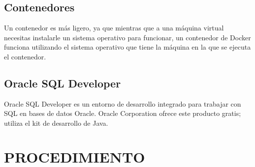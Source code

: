 \documentclass[preprint,12pt]{elsarticle}
\begin{document}
\subsection {\textbf{Contenedores}}
Un contenedor es más ligero, ya que mientras que a una máquina virtual necesitas instalarle un sistema operativo para funcionar, un contenedor de Docker funciona utilizando el sistema operativo que tiene la máquina en la que se ejecuta el contenedor.
\subsection{\textbf{Oracle SQL Developer}}
Oracle SQL Developer es un entorno de desarrollo integrado para trabajar con SQL en bases de datos Oracle. Oracle Corporation ofrece este producto gratis; utiliza el kit de desarrollo de Java.


\section{PROCEDIMIENTO}
\end{document}

